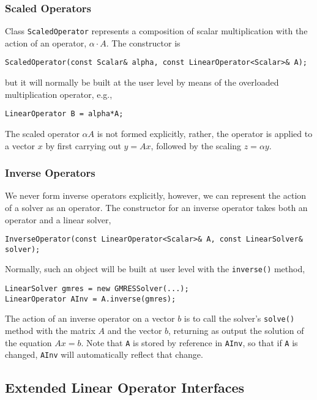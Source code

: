 \subsubsection{Scaled Operators}

Class \verb+ScaledOperator+ represents a composition of scalar multiplication with
the action of an operator, $\alpha \cdot A$. 
The constructor is 
{\scriptsize\begin{verbatim}
ScaledOperator(const Scalar& alpha, const LinearOperator<Scalar>& A);
\end{verbatim}}
but it will normally be built at the user level by means of the overloaded
multiplication operator, e.g., 
{\scriptsize\begin{verbatim}
LinearOperator B = alpha*A;
\end{verbatim}}
The scaled operator $\alpha A$ is not formed explicitly, rather, the 
operator is applied to a vector $x$ by first carrying out $y=A x$, followed
by the scaling $z=\alpha y$. 

\subsubsection{Inverse Operators}

We never form inverse operators explicitly, however, we can represent the
action of a solver as an operator. The constructor for an inverse operator
takes both an operator and a linear solver, 
{\scriptsize\begin{verbatim}
InverseOperator(const LinearOperator<Scalar>& A, const LinearSolver& solver);
\end{verbatim}}
Normally, such an object will be built at user level with the \verb+inverse()+
method,
{\scriptsize\begin{verbatim}
LinearSolver gmres = new GMRESSolver(...);
LinearOperator AInv = A.inverse(gmres);
\end{verbatim}}
The action of an inverse operator on a vector $b$ is to call the solver's \verb+solve()+
method with the matrix $A$ and the vector $b$, returning as output
the solution of the equation $Ax=b$. 
Note that  \verb+A+ is stored by reference in \verb+AInv+, so that if \verb+A+
is changed,  \verb+AInv+ will automatically reflect that change.

\subsection{Extended Linear Operator Interfaces}

